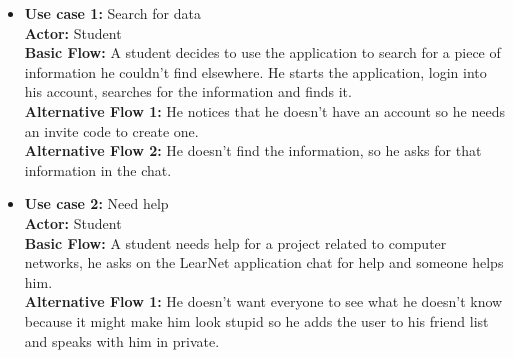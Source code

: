\documentclass[runningheads]{llncs}
\begin{document}
\begin{itemize}


\item \textbf{Use case 1:} Search for data\\
\textbf{Actor:} Student\\
\textbf{Basic Flow:} A student decides to use the application to search for a piece of information he couldn't find elsewhere. He starts the application, login into his account, searches for the information and finds it.\\
\textbf{Alternative Flow 1:} He notices that he doesn't have an account so he needs an invite code to create one.\\
\textbf{Alternative Flow 2:} He doesn't find the information, so he asks for that information in the chat.

\item \textbf{Use case 2:} Need help\\
\textbf{Actor:} Student\\
\textbf{Basic Flow:} A student needs help for a project related to computer networks, he asks on the LearNet application chat for help and someone helps him.\\
\textbf{Alternative Flow 1:} He doesn't want everyone to see what he doesn't know because it might make him look stupid so he adds the user to his friend list and speaks with him  in private.



\end{itemize}
\end{document}
